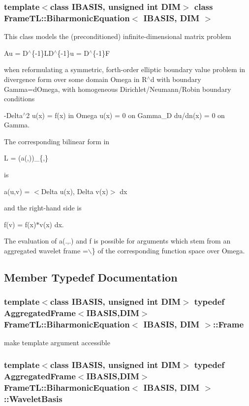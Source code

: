 \subsubsection*{template$<$class IBASIS, unsigned int DIM$>$ class FrameTL::BiharmonicEquation$<$ IBASIS, DIM $>$}

This class models the (preconditioned) infinite-dimensional matrix problem

Au = D$^\wedge$\{-1\}LD$^\wedge$\{-1\}u = D$^\wedge$\{-1\}F

when reformulating a symmetric, forth-order elliptic boundary value problem in divergence form over some domain Omega in R$^\wedge$d with boundary Gamma=dOmega, with homogeneous Dirichlet/Neumann/Robin boundary conditions

-Delta$^\wedge$2 u(x) = f(x) in Omega u(x) = 0 on Gamma\_\-D du/dn(x) = 0 on Gamma.

The corresponding bilinear form in

L = (a(,))\_\-\{,\}

is

a(u,v) =  $<$Delta u(x), Delta v(x)$>$ dx

and the right-hand side is

f(v) =  f(x)$\ast$v(x) dx.

The evaluation of a(.,.) and f is possible for arguments  which stem from an aggregated wavelet frame =$\backslash$\} of the corresponding function space over Omega. 

\subsection{Member Typedef Documentation}
\hypertarget{classFrameTL_1_1BiharmonicEquation_a6589dcf7cfc46ba411c3f35146e1a5d}{
\subsubsection[Frame]{\setlength{\rightskip}{0pt plus 5cm}template$<$class IBASIS, unsigned int DIM$>$ {\bf typedef} {\bf AggregatedFrame}$<$IBASIS,DIM$>$ {\bf FrameTL::BiharmonicEquation}$<$ IBASIS, DIM $>$::{\bf Frame}}}
\label{classFrameTL_1_1BiharmonicEquation_a6589dcf7cfc46ba411c3f35146e1a5d}


make template argument accessible \hypertarget{classFrameTL_1_1BiharmonicEquation_2c96ea759f7da9b09717e9a68eb49a6f}{
\subsubsection[WaveletBasis]{\setlength{\rightskip}{0pt plus 5cm}template$<$class IBASIS, unsigned int DIM$>$ {\bf typedef} {\bf AggregatedFrame}$<$IBASIS,DIM$>$ {\bf FrameTL::BiharmonicEquation}$<$ IBASIS, DIM $>$::{\bf WaveletBasis}}}
\label{classFrameTL_1_1BiharmonicEquation_2c96ea759f7da9b09717e9a68eb49a6f}


